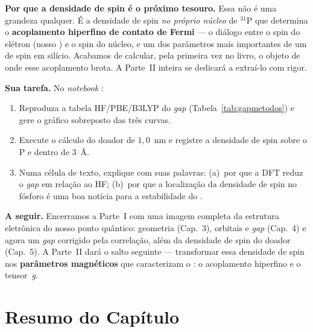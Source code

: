 \begin{caixaancora}
\vspace{0.3cm}
\textbf{Por que a densidade de spin é o próximo tesouro.} Essa não é uma grandeza
qualquer. É a densidade de spin \emph{no próprio núcleo} de $^{31}$P que determina
o \textbf{acoplamento hiperfino de contato de Fermi} --- o diálogo entre o spin do
elétron (nosso \qubit{}) e o spin do núcleo, e um dos parâmetros mais importantes
de um \qubit{} de spin em silício. Acabamos de calcular, pela primeira vez no
livro, o objeto de onde esse acoplamento brota. A Parte~II inteira se dedicará a
extraí-lo com rigor.

\vspace{0.3cm}
\textbf{Sua tarefa.} No \emph{notebook} :
\begin{enumerate}[leftmargin=*,nosep]
  \item Reproduza a tabela HF/PBE/B3LYP do \emph{gap} (Tabela~\ref{tab:gapmetodos})
        e gere o gráfico sobreposto das três curvas.
  \item Execute o cálculo  do doador de $1{,}0$~nm e registre a
        densidade de spin sobre o P e dentro de $3$~Å.
  \item Numa célula de texto, explique com suas palavras: (a)~por que a DFT reduz o
        \emph{gap} em relação ao HF; (b)~por que a localização da densidade de spin
        no fósforo é uma boa notícia para a estabilidade do \qubit{}.
\end{enumerate}

\vspace{0.3cm}
\textbf{A seguir.} Encerramos a Parte~I com uma imagem completa da estrutura
eletrônica do nosso ponto quântico: geometria (Cap.~3), orbitais e \emph{gap}
(Cap.~4) e agora um \emph{gap} corrigido pela correlação, além da densidade de spin
do doador (Cap.~5). A Parte~II dará o salto seguinte --- transformar essa densidade
de spin nos \textbf{parâmetros magnéticos} que caracterizam o \qubit{}: o
acoplamento hiperfino e o tensor~\emph{g}.
\end{caixaancora}

\section*{Resumo do Capítulo}

